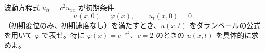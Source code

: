 
波動方程式 $u_{tt} = c^{2} u_{xx}$ が初期条件
\[
u(x,0) = \varphi(x), \qquad u_{t}(x,0) = 0
\]
（初期変位のみ、初期速度なし）を満たすとき、$u(x,t)$ をダランベールの公式を用いて $\varphi$ で表せ。特に $\varphi(x) = e^{-x^{2}}$、$c = 2$ のときの $u(x,t)$ を具体的に求めよ。
